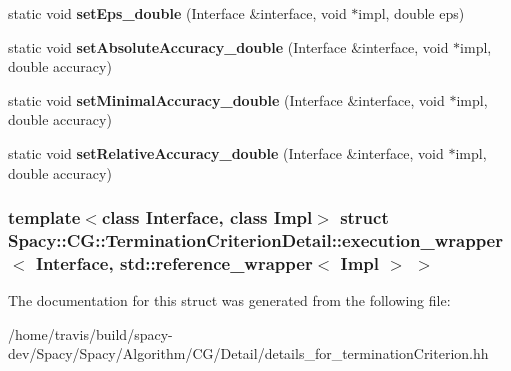 \begin{DoxyCompactItemize}
\item 
\hypertarget{structSpacy_1_1CG_1_1TerminationCriterionDetail_1_1execution__wrapper_3_01Interface_00_01std_1_15f5761607441ed2de6db2283270121dc_a3d011396bbae7d265a644ba3afb252c1}{static void {\bfseries set\-Eps\-\_\-double} (\-Interface \&interface, void $\ast$impl, double eps)}\label{structSpacy_1_1CG_1_1TerminationCriterionDetail_1_1execution__wrapper_3_01Interface_00_01std_1_15f5761607441ed2de6db2283270121dc_a3d011396bbae7d265a644ba3afb252c1}

\item 
\hypertarget{structSpacy_1_1CG_1_1TerminationCriterionDetail_1_1execution__wrapper_3_01Interface_00_01std_1_15f5761607441ed2de6db2283270121dc_a444e27a063ff25415bbcc8b789252cc0}{static void {\bfseries set\-Absolute\-Accuracy\-\_\-double} (\-Interface \&interface, void $\ast$impl, double accuracy)}\label{structSpacy_1_1CG_1_1TerminationCriterionDetail_1_1execution__wrapper_3_01Interface_00_01std_1_15f5761607441ed2de6db2283270121dc_a444e27a063ff25415bbcc8b789252cc0}

\item 
\hypertarget{structSpacy_1_1CG_1_1TerminationCriterionDetail_1_1execution__wrapper_3_01Interface_00_01std_1_15f5761607441ed2de6db2283270121dc_a54c54f2f37b6d52d00b1d51dc26d6ac1}{static void {\bfseries set\-Minimal\-Accuracy\-\_\-double} (\-Interface \&interface, void $\ast$impl, double accuracy)}\label{structSpacy_1_1CG_1_1TerminationCriterionDetail_1_1execution__wrapper_3_01Interface_00_01std_1_15f5761607441ed2de6db2283270121dc_a54c54f2f37b6d52d00b1d51dc26d6ac1}

\item 
\hypertarget{structSpacy_1_1CG_1_1TerminationCriterionDetail_1_1execution__wrapper_3_01Interface_00_01std_1_15f5761607441ed2de6db2283270121dc_a08e723623c3ebc2d25998e29b5e69dd3}{static void {\bfseries set\-Relative\-Accuracy\-\_\-double} (\-Interface \&interface, void $\ast$impl, double accuracy)}\label{structSpacy_1_1CG_1_1TerminationCriterionDetail_1_1execution__wrapper_3_01Interface_00_01std_1_15f5761607441ed2de6db2283270121dc_a08e723623c3ebc2d25998e29b5e69dd3}

\end{DoxyCompactItemize}
\subsubsection*{template$<$class Interface, class Impl$>$ struct Spacy\-::\-C\-G\-::\-Termination\-Criterion\-Detail\-::execution\-\_\-wrapper$<$ Interface, std\-::reference\-\_\-wrapper$<$ Impl $>$ $>$}



\-The documentation for this struct was generated from the following file\-:\begin{DoxyCompactItemize}
\item 
/home/travis/build/spacy-\/dev/\-Spacy/\-Spacy/\-Algorithm/\-C\-G/\-Detail/details\-\_\-for\-\_\-termination\-Criterion.\-hh\end{DoxyCompactItemize}

